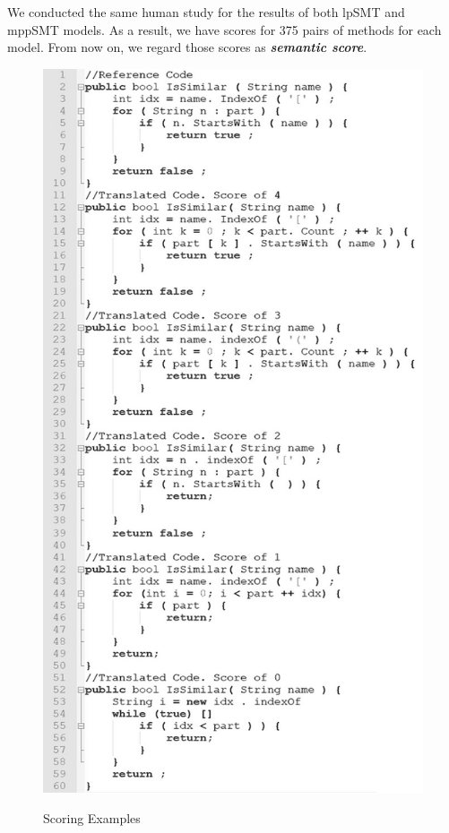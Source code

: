 
We conducted the same human study for the results of both lpSMT and mppSMT models. As a result, we have scores for 375 pairs of methods for each model. From now on, we regard those scores as \textbf{{\em semantic score}}.

\begin{figure}
\caption{Scoring Examples}
\centering
\includegraphics{img/scoreExamples}
\label{fig:scoreEG}
\end{figure}


